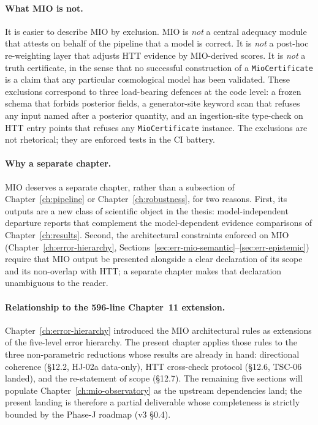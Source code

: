 \paragraph{What MIO is not.}

It is easier to describe MIO by exclusion.  MIO is
\emph{not} a central adequacy module that attests on behalf
of the pipeline that a model is correct.  It is \emph{not} a
post-hoc re-weighting layer that adjusts HTT evidence by
MIO-derived scores.  It is \emph{not} a truth certificate,
in the sense that no successful construction of a
\texttt{MioCertificate} is a claim that any particular
cosmological model has been validated.  These exclusions
correspond to three load-bearing defences at the code level:
a frozen schema that forbids posterior fields, a
generator-site keyword scan that refuses any input named
after a posterior quantity, and an ingestion-site type-check
on HTT entry points that refuses any
\texttt{MioCertificate} instance.  The exclusions are not
rhetorical; they are enforced tests in the CI battery.

\paragraph{Why a separate chapter.}

MIO deserves a separate chapter, rather than a subsection of
Chapter~\ref{ch:pipeline} or Chapter~\ref{ch:robustness},
for two reasons.  First, its outputs are a new class of
scientific object in the thesis: model-independent departure
reports that complement the model-dependent evidence
comparisons of Chapter~\ref{ch:results}.  Second, the
architectural constraints enforced on MIO
(Chapter~\ref{ch:error-hierarchy},
Sections~\ref{sec:err-mio-semantic}--\ref{sec:err-epistemic})
require that MIO output be presented alongside a clear
declaration of its scope and its non-overlap with HTT; a
separate chapter makes that declaration unambiguous to the
reader.

\paragraph{Relationship to the 596-line Chapter~11 extension.}

Chapter~\ref{ch:error-hierarchy} introduced the MIO
architectural rules as extensions of the five-level error
hierarchy.  The present chapter applies those rules to the
three non-parametric reductions whose results are already
in hand: directional coherence (§12.2, HJ-02a data-only),
HTT cross-check protocol (§12.6, TSC-06 landed), and the
re-statement of scope (§12.7).  The remaining five sections
will populate Chapter~\ref{ch:mio-observatory} as the
upstream dependencies land; the present landing is therefore
a partial deliverable whose completeness is strictly
bounded by the Phase-J roadmap (v3 §0.4).


